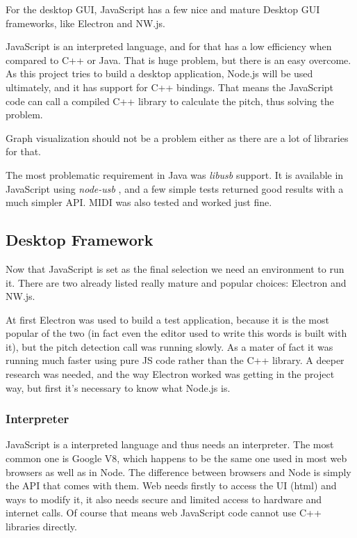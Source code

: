 For the desktop GUI, JavaScript has a few nice and mature Desktop GUI frameworks,
like Electron and NW.js. 

JavaScript is an interpreted language, and for that has a low efficiency when
compared to C++ or Java. That is huge problem, but there is an easy overcome. As
this project tries to build a desktop application, Node.js will be used ultimately,
and it has support for C++ bindings. That means the JavaScript code can call a
compiled C++ library to calculate the pitch, thus solving the problem. 

Graph visualization should not be a problem either as there are a lot of libraries
for that. 

The most problematic requirement in Java was \textit{libusb} support. It is available
in JavaScript using \textit{node-usb} \cite{node-usb}, and a few simple tests
returned good results with a much simpler API. MIDI was also tested and worked just fine.

\subsection{Desktop Framework}
Now that JavaScript is set as the final selection we need an environment to run
it. There are two already listed really mature and popular choices: Electron and NW.js. 

At first Electron was used to build a test application, because it is the most popular
of the two (in fact even the editor used to write this words is built with it),
but the pitch detection call was running slowly. As a mater of fact it was running
much faster using pure JS code rather than the C++ library. A deeper research
was needed, and the way Electron worked was getting in the project way, but first it's
necessary to know what Node.js is.

\subsubsection{Interpreter}
JavaScript is a interpreted language and thus needs an interpreter. The most
common one is Google V8, which happens to be the same one used in most web
browsers as well as in Node. The difference between browsers and Node is simply
the API that comes with them. Web needs firstly to access the UI (html) and ways to
modify it, it also needs secure and limited access to hardware and internet calls.
Of course that means web JavaScript code cannot use C++ libraries directly. 

